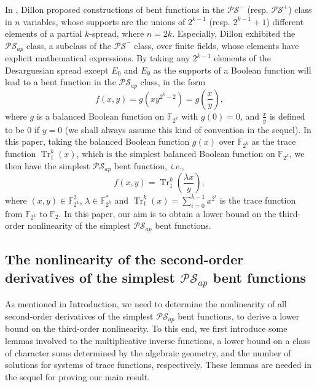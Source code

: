\documentclass{article}
\newcommand{\F}{\mathbb{F}}
\newcommand{\0}{\textbf{0}}
\newcommand{\1}{\textbf{1}}
\newcommand{\TRACE}{\operatorname{Tr}_1^k}
\theoremstyle{plain}
\begin{document}
In \cite{Dillon1974PSbent}, Dillon proposed constructions of bent functions in the $\mathcal{PS}^-$ (resp. $\mathcal{PS}^+$) class in $n$ variables, whose supports are the unions of $2^{k-1}$ (resp. $2^{k-1}+1$) different elements of a partial $k$-spread, where $n=2k$.
Especially, Dillon exhibited the $\mathcal{PS}_{ap}$ class, a subclass of the $\mathcal{PS}^-$ class, over finite fields, whose elements have explicit mathematical expressions.
By taking any $2^{k-1}$ elements of the Desarguesian spread except $E_0$ and $E_{\emptyset}$ as the supports of a Boolean function will lead to a bent function in the $\mathcal{PS}_{ap}$ class, in the form
    \begin{equation*}\label{Eqn_PS_bent}
        f(x,y)=g\left(xy^{2^k-2}\right)=g\left(\frac{x}{y}\right),
    \end{equation*}
    where $g$ is a balanced Boolean function on $\F_{2^{k}}$ with $g(0)=0$, and $\frac{x}{y}$ is defined to be $0$ if $y=0$ (we shall always assume this kind of convention in the sequel).
    In this paper, taking the balanced Boolean function $g(x)$ over $\F_{2^k}$ as the trace function $\TRACE(x)$, which is the simplest balanced Boolean function on $\F_{2^k}$, we then have the simplest
    $\mathcal{PS}_{ap}$ bent function, \emph{i.e.},
    \begin{equation*}\label{sub-bent}
        f(x,y)=\TRACE\left(\frac{\lambda x}{y}\right),
    \end{equation*}
    where $(x,y)\in\F_{2^k}^2$, $\lambda\in\F_{2^k}^{*}$ and $\TRACE(x)=\sum\limits_{i=0}^{k-1}x^{2^i}$ is the trace function from $\F_{2^k}$ to $\F_2$.
    In this paper, our aim is to obtain a lower bound on the third-order nonlinearity of the simplest $\mathcal{PS}_{ap}$ bent functions.
    \subsection{The nonlinearity of the second-order derivatives of the simplest $\mathcal{PS}_{ap}$ bent functions}
    As mentioned in Introduction, 
    we need to determine the nonlinearity of all second-order derivatives of the simplest $\mathcal{PS}_{ap}$ bent functions, to derive a lower bound on the third-order nonlinearity. 
    To this end, we first introduce some lemmas involved to the multiplicative inverse functions,
    a lower bound on a class of character sums determined by the algebraic geometry,
    and the number of solutions for systems of trace functions, respectively.
    These lemmas are needed in the sequel for proving our main result.
\end{document}
